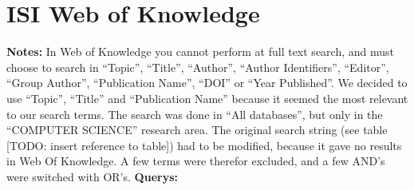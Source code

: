 \section{ISI Web of Knowledge}
\par \textbf{Notes:} In Web of Knowledge you cannot perform at full text search, and must choose to search in ``Topic'', ``Title'', ``Author'', ``Author Identifiers'', ``Editor'', ``Group Author'', ``Publication Name'', ``DOI'' or ``Year Published''. We decided to use ``Topic'', ``Title'' and ``Publication Name'' because it seemed the most relevant to our search terms. The search was done in ``All databases'', but only in the ``COMPUTER SCIENCE'' research area. The original search string (see table [TODO: insert reference to table]) had to be modified, because it gave no results in Web Of Knowledge. A few terms were therefor excluded, and a few AND's were switched with OR's. 
\textbf{Querys:}
